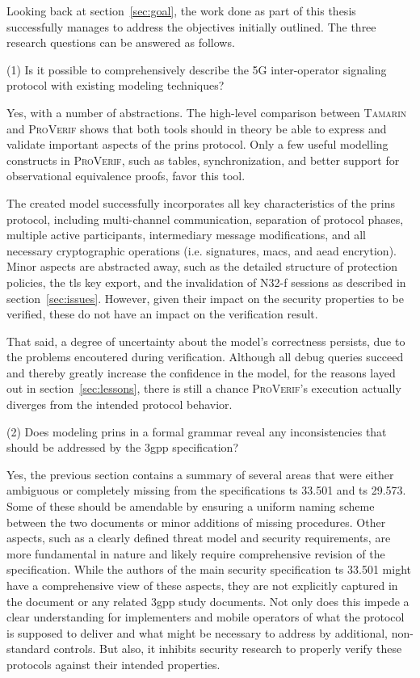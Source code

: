 Looking back at section~\ref{sec:goal}, the work done as part of this thesis successfully manages to address the objectives initially outlined.
The three research questions can be answered as follows.\bigskip

\noindent
(1) Is it possible to comprehensively describe the 5G inter-operator signaling protocol with existing modeling techniques?

Yes, with a number of abstractions.
The high-level comparison between \textsc{Tamarin} and \textsc{ProVerif} shows that both tools should in theory be able to express and validate important aspects of the \gls{prins} protocol.
Only a few useful modelling constructs in \textsc{ProVerif}, such as tables, synchronization, and better support for observational equivalence proofs, favor this tool.

The created model successfully incorporates all key characteristics of the \gls{prins} protocol, including multi-channel communication, separation of protocol phases, multiple active participants, intermediary message modifications, and all necessary cryptographic operations (i.e. signatures, \glspl{mac}, and \gls{aead} encrytion).
Minor aspects are abstracted away, such as the detailed structure of protection policies, the \gls{tls} key export, and the invalidation of N32-f sessions as described in section~\ref{sec:issues}.
However, given their impact on the security properties to be verified, these do not have an impact on the verification result.

That said, a degree of uncertainty about the model's correctness persists, due to the problems encoutered during verification.
Although all debug queries succeed and thereby greatly increase the confidence in the model, for the reasons layed out in section~\ref{sec:lessons}, there is still a chance \textsc{ProVerif}'s execution actually diverges from the intended protocol behavior.\bigskip

\noindent
(2) Does modeling \gls{prins} in a formal grammar reveal any inconsistencies that should be addressed by the \gls{3gpp} specification?

Yes, the previous section contains a summary of several areas that were either ambiguous or completely missing from the specifications \gls{ts} 33.501 and \gls{ts} 29.573.
Some of these should be amendable by ensuring a uniform naming scheme between the two documents or minor additions of missing procedures.
Other aspects, such as a clearly defined threat model and security requirements, are more fundamental in nature and likely require comprehensive revision of the specification.
While the authors of the main security specification \gls{ts} 33.501 might have a comprehensive view of these aspects, they are not explicitly captured in the document or any related \gls{3gpp} study documents.
Not only does this impede a clear understanding for implementers and mobile operators of what the protocol is supposed to deliver and what might be necessary to address by additional, non-standard controls.
But also, it inhibits security research to properly verify these protocols against their intended properties.

